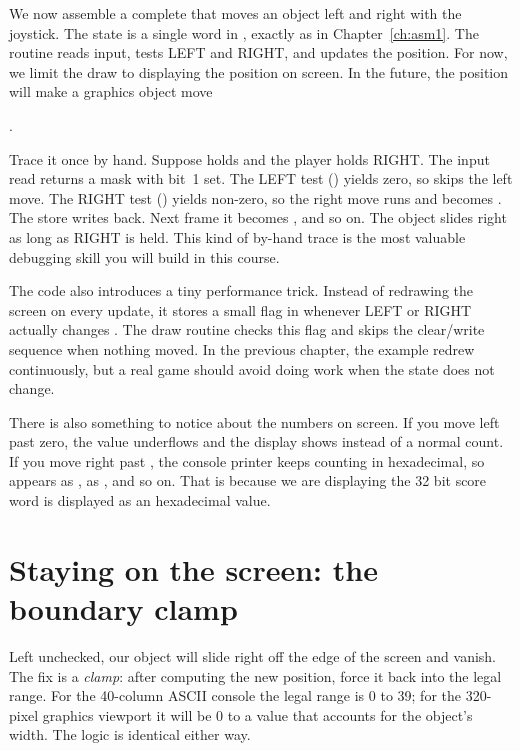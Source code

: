 We now assemble a complete  that moves an object left and right with
the joystick. The state is a single word in , exactly as in
Chapter~\ref{ch:asm1}. The routine reads input, tests LEFT and RIGHT, and updates
the position. For now, we limit the draw to displaying the position on screen.
    In the future, the position will make a graphics object move 
    
    \citep{prg32repo}.

    

Trace it once by hand. Suppose  holds  and the player
holds RIGHT. The input read returns a mask with bit~1 set. The LEFT test
() yields zero, so  skips the left move. The RIGHT
test () yields non-zero, so the right move runs and 
becomes . The store writes  back. Next frame it becomes
, and so on. The object slides right as long as RIGHT is held. This kind
of by-hand trace is the most valuable debugging skill you will build in this
course.

The code also introduces a tiny performance trick. Instead of redrawing the
screen on every update, it stores a small flag in  whenever
LEFT or RIGHT actually changes . The draw routine checks this
flag and skips the clear/write sequence when nothing moved. In the previous
chapter, the example redrew continuously, but a real game should avoid doing
work when the state does not change.

There is also something to notice about the numbers on screen. If you move
left past zero, the value underflows and the display shows  instead
of a normal count. If you move right past , the console printer keeps
counting in hexadecimal, so  appears as ,  as
, and so on. That is because we are displaying the 
32 bit score word is displayed as an hexadecimal value.

\section{Staying on the screen: the boundary clamp}

Left unchecked, our object will slide right off the edge of the screen and
vanish. The fix is a \emph{clamp}: after computing the new position, force it back
into the legal range. For the 40-column ASCII console the legal range is 0 to 39;
for the 320-pixel graphics viewport it will be 0 to a value that accounts for the
object's width. The logic is identical either way.

